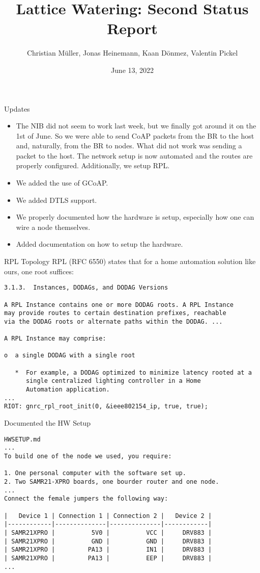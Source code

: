 \documentclass[10pt, xcolor=svgnames]{beamer}
\title{Lattice Watering: Second Status Report}
\author{Christian Müller, Jonas Heinemann, Kaan Dönmez, Valentin Pickel}
\institute{
    Software Project on Internet Communication

    Summer Term 2022
    
    Freie Universität Berlin

    Institute for Computer Science
}
\date{June 13, 2022}
\begin{document}
\maketitle

\begin{frame}{Updates}
    \begin{itemize}
        \item The NIB did not seem to work last week, but we finally got around it on the 1st of June. So we were able to send CoAP packets from the BR to the host and, naturally, from the BR to nodes. What did not work was sending a packet to the host. The network setup is now automated and the routes are properly configured. Additionally, we setup RPL.
        \item We added the use of GCoAP.
        \item We added DTLS support.
        \item We properly documented how the hardware is setup, especially how one can wire a node themselves.
        \item Added documentation on how to setup the hardware.
    \end{itemize}
\end{frame}

\begin{frame}[fragile]{RPL Topology}
    RPL (RFC 6550) states that for a home automation solution like ours, one root suffices:

    \begin{verbatim}
3.1.3.  Instances, DODAGs, and DODAG Versions

A RPL Instance contains one or more DODAG roots. A RPL Instance
may provide routes to certain destination prefixes, reachable
via the DODAG roots or alternate paths within the DODAG. ...

A RPL Instance may comprise:

o  a single DODAG with a single root

   *  For example, a DODAG optimized to minimize latency rooted at a
      single centralized lighting controller in a Home
      Automation application.
...
RIOT: gnrc_rpl_root_init(0, &ieee802154_ip, true, true);
    \end{verbatim}
\end{frame}

\begin{frame}[fragile]{Documented the HW Setup}
    \begin{verbatim}
HWSETUP.md
...
To build one of the node we used, you require:
        
1. One personal computer with the software set up.
2. Two SAMR21-XPRO boards, one bourder router and one node.
...
Connect the female jumpers the following way:

|   Device 1 | Connection 1 | Connection 2 |   Device 2 |
|------------|--------------|--------------|------------|
| SAMR21XPRO |          5V0 |          VCC |     DRV883 |
| SAMR21XPRO |          GND |          GND |     DRV883 |
| SAMR21XPRO |         PA13 |          IN1 |     DRV883 |
| SAMR21XPRO |         PA13 |          EEP |     DRV883 |
...
    \end{verbatim}
\end{frame}
\end{document}
